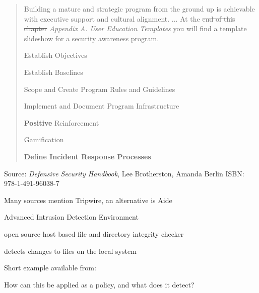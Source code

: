 \documentclass[Screen16to9,17pt]{foils}
\begin{document}


\begin{quote}
Building a mature and strategic program from the ground up is achievable with executive support and cultural alignment. ...  At the \sout{end of this chapter} \emph{Appendix A. User Education Templates} you will find a template slideshow for a security awareness program.

\begin{list2}
\item Establish Objectives
\item Establish Baselines
\item Scope and Create Program Rules and Guidelines
\item Implement and Document Program Infrastructure
\item {\bf Positive} Reinforcement
\item Gamification
\item {\bf Define Incident Response Processes}
\end{list2}
\end{quote}
Source: \emph{Defensive Security Handbook}, Lee Brotherston, Amanda Berlin ISBN: 978-1-491-96038-7






\begin{list1}
\item Many sources mention Tripwire, an alternative is Aide
\item Advanced Intrusion Detection Environment
\item open source host based file and directory integrity checker
\item detects changes to files on the local system
\item Short example available from:\\
{\footnotesize{}}
\item {}
\end{list1}

How can this be applied as a policy, and what does it detect?



\end{document}
